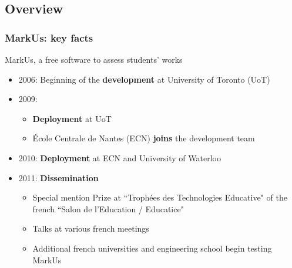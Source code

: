 \documentclass[hyperref,french,usenames,xcolor=dvipsnames]{beamer}
\begin{document}
\subsection*{Overview}


\frame
{
  \frametitle{MarkUs: key facts}

\begin{block}{MarkUs, a free software to assess students' works}
\begin{itemize}
\item 2006: Beginning of the \textbf{development} at University of Toronto (UoT)
\item 2009: 
\begin{itemize}
\item \textbf{Deployment} at UoT 
\item École Centrale de Nantes (ECN) \textbf{joins} the development team  
\end{itemize}
\item 2010: \textbf{Deployment} at ECN and University of Waterloo 
\item 2011: \textbf{Dissemination}
\begin{itemize}
\item Special mention Prize at ``Troph\'{e}es des Technologies Educative" of the french ``Salon de l'Education / Educatice"
\item Talks at various french meetings
\item Additional french universities and engineering school begin testing MarkUs
\end{itemize}
\end{itemize}

\end{block}
}
\end{document}
